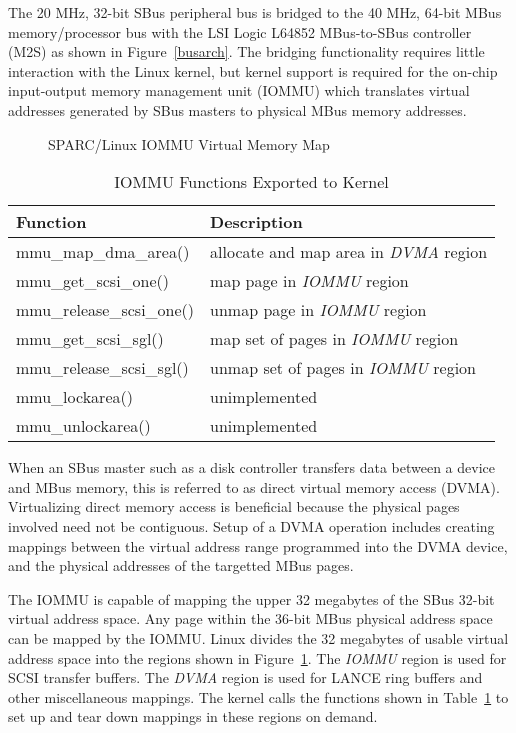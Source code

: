 \documentclass{article}
\begin{document}
The 20 MHz, 32-bit SBus\cite{Catanzaro91} peripheral bus is bridged to 
the 40 MHz, 64-bit MBus memory/processor bus with the LSI Logic L64852 
MBus-to-SBus controller\cite{LSI92a} (M2S) as shown in Figure~\ref{busarch}.
The bridging functionality
requires little interaction with the Linux kernel, but kernel support 
is required for the on-chip input-output memory management unit (IOMMU) 
which translates virtual addresses generated by SBus masters to physical 
MBus memory addresses.

\begin{figure}
\begin{center}
\caption{SPARC/Linux IOMMU Virtual Memory Map}
\label{iomem}
\end{center}
\end{figure}

\begin{table}
\begin{center}
\begin{tabular}{|l|l|}\hline\hline
Function			& Description \\ \hline
mmu\_map\_dma\_area()		& allocate and map area in {\em DVMA} region \\
mmu\_get\_scsi\_one()		& map page in {\em IOMMU} region \\
mmu\_release\_scsi\_one()	& unmap page in {\em IOMMU} region \\
mmu\_get\_scsi\_sgl()		& map set of pages in {\em IOMMU} region \\
mmu\_release\_scsi\_sgl()	& unmap set of pages in {\em IOMMU} region \\
mmu\_lockarea()			& unimplemented \\
mmu\_unlockarea()		& unimplemented \\ \hline
\end{tabular}
\caption{IOMMU Functions Exported to Kernel}
\label{iommufun}
\end{center}
\end{table}

  When an SBus master such as a disk controller transfers data between
a device and MBus memory, this is referred to as direct virtual
memory access (DVMA).  Virtualizing direct memory access is beneficial
because the physical pages involved need not be contiguous.  Setup 
of a DVMA operation includes creating mappings between the
virtual address range programmed into the DVMA device, and the 
physical addresses of the targetted MBus pages.  

  The IOMMU is capable of mapping the upper 32 megabytes of the SBus 
32-bit virtual address space.  Any page within the 36-bit MBus physical
address space can be mapped by the IOMMU.
Linux divides the 32 megabytes of usable virtual address space into 
the regions shown in Figure~\ref{iomem}.
The {\em IOMMU} region is used for SCSI transfer buffers.  
The {\em DVMA}  region is used for LANCE ring buffers and other 
miscellaneous mappings.  The kernel calls the functions shown in 
Table~\ref{iommufun} to set up and tear down mappings in these regions
on demand.
\end{document}
